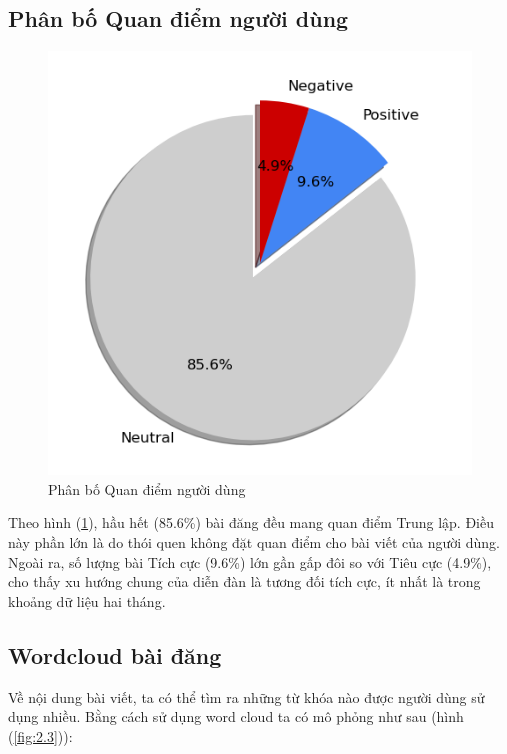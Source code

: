 \subsection{Phân bố Quan điểm người dùng}
\begin{figure}
\raggedright
\includegraphics[width=.98\linewidth]{images/plot-2.27-senanalysis.png}

\caption{Phân bố Quan điểm người dùng}
\label{fig:2.30}
\end{figure}

Theo hình (\ref{fig:2.30}), hầu hết (85.6\%) bài đăng đều mang quan điểm Trung lập. Điều này phần lớn là do thói quen không đặt quan điểm cho bài viết của người dùng. Ngoài ra, số lượng bài Tích cực (9.6\%) lớn gần gấp đôi so với Tiêu cực (4.9\%), cho thấy xu hướng chung của diễn đàn là tương đối tích cực, ít nhất là trong khoảng dữ liệu hai tháng.

\subsection{Wordcloud bài đăng}

Về nội dung bài viết, ta có thể tìm ra những từ khóa nào được người dùng sử dụng nhiều. Bằng cách sử dụng word cloud ta có mô phỏng như sau (hình (\ref{fig:2.3})):\\

